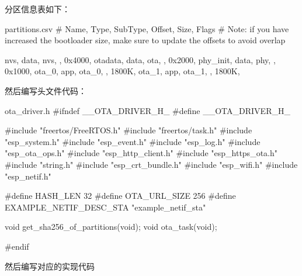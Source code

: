 \documentclass[lang=cn,newtx,10pt,scheme=chinese]{elegantbook}
\begin{document}
分区信息表如下：

\begin{mycode}{partitions.csv}
# Name,   Type, SubType, Offset,  Size, Flags
# Note: if you have increased the bootloader size, make sure to update the offsets to avoid overlap

nvs,      data, nvs,     ,        0x4000,
otadata,  data, ota,     ,        0x2000,
phy_init, data, phy,     ,        0x1000,
ota_0,    app,  ota_0,   ,        1800K,
ota_1,    app,  ota_1,   ,        1800K,
\end{mycode}

然后编写头文件代码：

\begin{mycode}{ota\_driver.h}
#ifndef __OTA_DRIVER_H_
#define __OTA_DRIVER_H_

#include "freertos/FreeRTOS.h"
#include "freertos/task.h"
#include "esp_system.h"
#include "esp_event.h"
#include "esp_log.h"
#include "esp_ota_ops.h"
#include "esp_http_client.h"
#include "esp_https_ota.h"
#include "string.h"
#include "esp_crt_bundle.h"
#include "esp_wifi.h"
#include "esp_netif.h"


#define HASH_LEN 32
#define OTA_URL_SIZE 256
#define EXAMPLE_NETIF_DESC_STA "example_netif_sta"

void get_sha256_of_partitions(void);
void ota_task(void);

#endif
\end{mycode}

然后编写对应的实现代码
\end{document}
